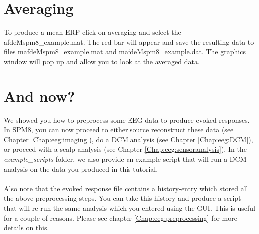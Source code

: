 \section{Averaging}
To produce a mean ERP click on averaging and select the afdeMspm8\_example.mat. The red bar will appear and save the resulting data to files mafdeMspm8\_example.mat and mafdeMspm8\_example.dat. The graphics window will pop up and allow you to look at the averaged data.


\section{And now?}
We showed you how to preprocess some EEG data to produce evoked responses. In SPM8, you can now proceed to either source reconstruct these data (see Chapter \ref{Chap:eeg:imaging}), do a DCM analysis (see Chapter \ref{Chap:eeg:DCM}), or proceed with a scalp analysis (see Chapter \ref{Chap:eeg:sensoranalysis}). In the \textit{example\_scripts} folder, we also provide an example script that will run a DCM analysis on the data you produced in this tutorial. 
\\
\\
Also note that the evoked response file contains a history-entry which stored all the above preprocessing steps. You can take this history and produce a script that will re-run the same analysis which you entered using the GUI. This is useful for a couple of reasons. Please see chapter \ref{Chap:eeg:preprocessing} for more details on this.
